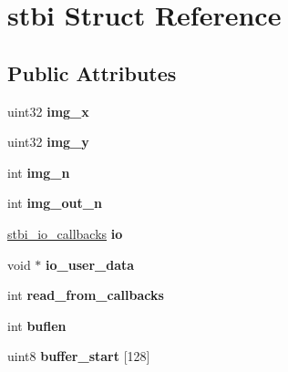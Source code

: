 \hypertarget{structstbi}{\section{stbi Struct Reference}
\label{structstbi}
}
\subsection*{Public Attributes}
\begin{DoxyCompactItemize}
\item 
\hypertarget{structstbi_af3b42c257fb0d8896f29ca3921540a42}{uint32 {\bfseries img\-\_\-x}}\label{structstbi_af3b42c257fb0d8896f29ca3921540a42}

\item 
\hypertarget{structstbi_a60cb5a630e268b2d12306c6eca246dd1}{uint32 {\bfseries img\-\_\-y}}\label{structstbi_a60cb5a630e268b2d12306c6eca246dd1}

\item 
\hypertarget{structstbi_ae22cfcc23f5ab67bede22942333ecbd7}{int {\bfseries img\-\_\-n}}\label{structstbi_ae22cfcc23f5ab67bede22942333ecbd7}

\item 
\hypertarget{structstbi_a33f6519d8f99b84afbde795dc7a931f2}{int {\bfseries img\-\_\-out\-\_\-n}}\label{structstbi_a33f6519d8f99b84afbde795dc7a931f2}

\item 
\hypertarget{structstbi_a86596e1eb2b0f57a60a18777bd37ff53}{\hyperlink{structstbi__io__callbacks}{stbi\-\_\-io\-\_\-callbacks} {\bfseries io}}\label{structstbi_a86596e1eb2b0f57a60a18777bd37ff53}

\item 
\hypertarget{structstbi_a9838a0c89630f283c25a16f4e30f40aa}{void $\ast$ {\bfseries io\-\_\-user\-\_\-data}}\label{structstbi_a9838a0c89630f283c25a16f4e30f40aa}

\item 
\hypertarget{structstbi_acb201cc1b3eb134f342cee89f5d11e70}{int {\bfseries read\-\_\-from\-\_\-callbacks}}\label{structstbi_acb201cc1b3eb134f342cee89f5d11e70}

\item 
\hypertarget{structstbi_a76d6f761529ecff7f02469b19371af0e}{int {\bfseries buflen}}\label{structstbi_a76d6f761529ecff7f02469b19371af0e}

\item 
\hypertarget{structstbi_af99edda496281a6ca1b58271cabdbc69}{uint8 {\bfseries buffer\-\_\-start} \mbox{[}128\mbox{]}}\label{structstbi_af99edda496281a6ca1b58271cabdbc69}


\end{DoxyCompactItemize}

